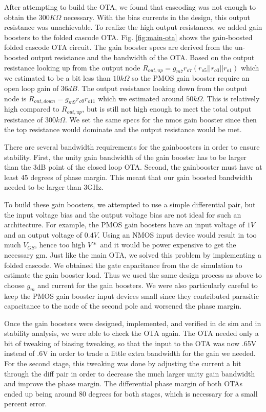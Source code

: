 \documentclass[conference]{IEEEtran}
\begin{document}
After attempting to build the OTA, we found that cascoding was not enough to obtain the $300K\Omega$ necessary. With the bias currents in the design, this output resistance was unachievable. To realize the high output resistances, we added gain boosters to the folded cascode OTA. Fig. \ref{fig:main-ota} shows the gain-boosted folded cascode OTA circuit. The gain booster specs are derived from the un-boosted output resistance and the bandwidth of the OTA. Based on the output resistance looking up from the output node $R_{out, up} = g_{m7}r_{o7}(r_{o5}||r_{o3}||r_{o1})$ which we estimated to be a bit less than $10k\Omega$ so the PMOS gain booster require an open loop gain of $36dB$. The output resistance looking down from the output node is $R_{out, down} = g_{m9}r_{o9}r_{o11}$ which we estimated around $50k\Omega$. This is relatively high compared to $R_{out, up}$, but is still not high enough to meet the total output resistance of $300k\Omega$. We set the same specs for the nmos gain booster since then the top resistance would dominate and the output resistance would be met.

There are several bandwidth requirements for the gainboosters in order to ensure stability. First, the unity gain bandwidth of the gain booster has to be larger than the 3dB point of the closed loop OTA. Second, the gainbooster must have at least 45 degrees of phase margin. This meant that our gain boosted bandwidth needed to be larger than 3GHz. 

To build these gain boosters, we attempted to use a simple differential pair, but the input voltage bias and the output voltage bias are not ideal for such an architecture. For example, the PMOS gain boosters have an input voltage of $1V$ and an output voltage of $0.4V$. Using an NMOS input device would result in too much $V_{GS}$, hence too high $V*$ and it would be power expensive to get the necessary gm. Just like the main OTA, we solved this problem by implementing a folded cascode. We obtained the gate capacitance from the dc simulation to estimate the gain booster load. Thus we used the same design process as above to choose $g_m$ and current for the gain boosters. We were also particularly careful to keep the PMOS gain booster input devices small since they contributed parasitic capacitance to the node of the second pole and worsened the phase margin.

Once the gain boosters were designed, implemented, and verified in dc sim and in stability analysis, we were able to check the OTA again. The OTA needed only a bit of tweaking of biasing tweaking, so that the input to the OTA was now .65V instead of .6V in order to trade a little extra bandwidth for the gain we needed. For the second stage, this tweaking was done by adjusting the current a bit through the diff pair in order to decrease the much larger unity gain bandwidth and improve the phase margin. The differential phase margin of both OTAs ended up being around 80 degrees for both stages, which is necessary for a small percent error.
\end{document}
